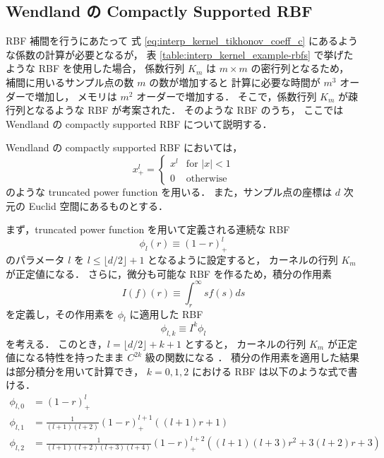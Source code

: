 \subsection{Wendland の Compactly Supported RBF}

RBF 補間を行うにあたって
式 \eqref{eq:interp_kernel_tikhonov_coeff_c} にあるような係数の計算が必要となるが，
表 \ref{table:interp_kernel_example-rbfs}
で挙げたような RBF を使用した場合，
係数行列 $K_m$ は $m \times m$ の密行列となるため，
補間に用いるサンプル点の数 $m$ の数が増加すると
計算に必要な時間が $m^3$ オーダーで増加し，
メモリは $m^2$ オーダーで増加する．
そこで，係数行列 $K_m$ が疎行列となるような RBF が考案された．
そのような RBF のうち，
ここでは Wendland の compactly supported RBF \cite{Wendland1995} について説明する．

Wendland の compactly supported RBF においては，
\begin{equation}
    x_+^l = \begin{cases}
        x^l & \text{for $|x| < 1$} \\
        0   & \text{otherwise}
    \end{cases}
\end{equation}
のような truncated power function を用いる．
また，サンプル点の座標は $d$ 次元の Euclid 空間にあるものとする．

まず，truncated power function を用いて定義される連続な RBF
\begin{equation}
    \phi_l(r) \equiv (1 - r)_+^l
\end{equation}
のパラメータ $l$ を $l \le \lfloor d/2 \rfloor + 1$ となるように設定すると，
カーネルの行列 $K_m$ が正定値になる．
さらに，微分も可能な RBF を作るため，積分の作用素
\begin{equation}
    I(f)(r) \equiv \int_r^\infty sf(s) ds
\end{equation}
を定義し，その作用素を $\phi_l$ に適用した RBF
\begin{equation}
    \phi_{l,k} \equiv I^k \phi_l
\end{equation}
を考える．
このとき，$l = \lfloor d/2 \rfloor + k + 1$ とすると，
カーネルの行列 $K_m$ が正定値になる特性を持ったまま
$C^{2k}$ 級の関数になる \cite[Theorem 3.5]{Wendland1995}．
積分の作用素を適用した結果は部分積分を用いて計算でき，
$k = 0, 1, 2$ における RBF は以下のような式で書ける．
\begin{align}
    \phi_{l,0} & = (1 - r)_+^l                                                    \\
    \phi_{l,1} & = \frac{1}{(l+1)(l+2)} (1 - r)_+^{l+1} \left( (l+1)r + 1 \right) \\
    \phi_{l,2} & = \frac{1}{(l+1)(l+2)(l+3)(l+4)} (1 - r)_+^{l+2}
    \left( (l+1)(l+3)r^2 + 3(l+2)r + 3 \right)
\end{align}


